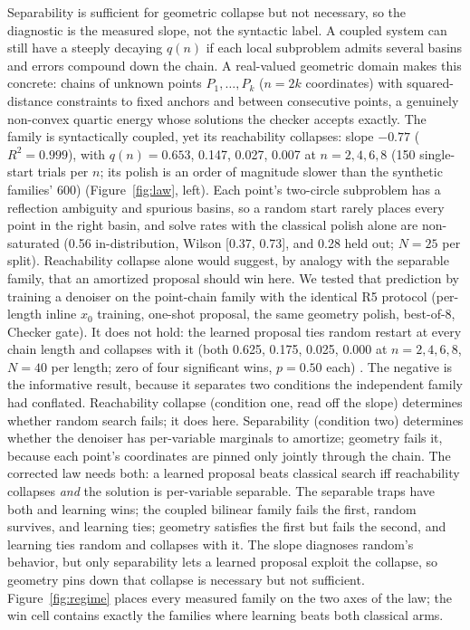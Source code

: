\documentclass[11pt]{article}
\begin{document}
Separability is sufficient for geometric collapse but not necessary, so the diagnostic is the
measured slope, not the syntactic label. A coupled system can still have a steeply decaying
$q(n)$ if each local subproblem admits several basins and errors compound down the chain. A
real-valued geometric domain makes this concrete: chains of unknown points $P_1, \dots, P_k$
($n = 2k$ coordinates) with squared-distance constraints to fixed anchors and between
consecutive points, a genuinely non-convex quartic energy whose solutions the checker accepts
exactly. The family is syntactically coupled, yet its reachability collapses: slope $-0.77$
($R^2 = 0.999$), with $q(n) = 0.653$, 0.147, 0.027, 0.007 at $n = 2, 4, 6, 8$ (150
single-start trials per $n$; its polish is an order of magnitude slower than the synthetic
families' 600)
(Figure~\ref{fig:law}, left). Each point's two-circle subproblem has a reflection ambiguity
and spurious basins, so a random start rarely places every point in the right basin, and solve
rates with the classical polish alone are non-saturated (0.56 in-distribution, Wilson
[0.37, 0.73], and 0.28 held out; $N = 25$ per split).
Reachability collapse alone would suggest, by analogy with the separable family, that an
amortized proposal should win here. We tested that prediction by training a denoiser on the
point-chain family with the identical R5 protocol (per-length inline $x_0$ training, one-shot
proposal, the same geometry polish, best-of-8, Checker gate). It does not hold: the learned
proposal ties random restart at every chain length and collapses with it (both 0.625, 0.175,
0.025, 0.000 at $n = 2, 4, 6, 8$, $N = 40$ per length; zero of four significant wins,
$p = 0.50$ each)
. The negative is the informative result, because it separates two conditions the independent
family had conflated. Reachability collapse (condition one, read off the slope) determines
whether random search fails; it does here. Separability (condition two) determines whether the
denoiser has per-variable marginals to amortize; geometry fails it, because each point's
coordinates are pinned only jointly through the chain. The corrected law needs both: a learned
proposal beats classical search iff reachability collapses \emph{and} the solution is
per-variable separable. The separable traps have both and learning wins; the coupled bilinear
family fails the first, random survives, and learning ties; geometry satisfies the first but
fails the second, and learning ties random and collapses with it. The slope diagnoses random's
behavior, but only separability lets a learned proposal exploit the collapse, so geometry
pins down that collapse is necessary but not sufficient. Figure~\ref{fig:regime} places every
measured family on the two axes of the law; the win cell contains exactly the families where
learning beats both classical arms.
\end{document}
